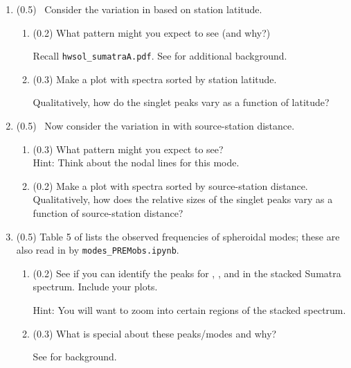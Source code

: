 \documentclass[11pt,titlepage,fleqn]{article}
\begin{document}
\begin{enumerate}

\item (0.5) \ptag\ Consider the variation in  based on station latitude.
%
\begin{enumerate}
\item (0.2) What pattern might you expect to see (and why?)

Recall \verb+hwsol_sumatraA.pdf+.
See \citet[][Figure 3]{SSteinOkal2007} for additional background.

\item (0.3) Make a plot with   spectra sorted by station latitude.

Qualitatively, how do the singlet peaks vary as a function of latitude?

\end{enumerate}


\item (0.5) \ptag\ Now consider the variation in  with source-station distance.
%
\begin{enumerate}
\item (0.3) What pattern might you expect to see? \\
Hint: Think about the nodal lines for this mode.

\item (0.2) Make a plot with   spectra sorted by source-station distance. Qualitatively, how does the relative sizes of the singlet peaks vary as a function of source-station distance?
\end{enumerate}


\item (0.5) Table 5 of \citet{PREM} lists the observed frequencies of spheroidal modes; these are also read in by \verb+modes_PREMobs.ipynb+.
%
\begin{enumerate}
\item (0.2) See if you can identify the peaks for , , and  in the stacked Sumatra spectrum. Include your plots.

Hint: You will want to zoom into certain regions of the stacked spectrum.

\item (0.3) What is special about these peaks/modes and why?

See \citet[][p. 106]{SteinWysession} for background.
\end{enumerate}

\end{enumerate}
\end{document}
